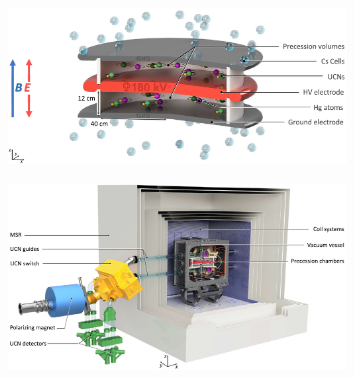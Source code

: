 \begin{refsection}
            \begin{figure}
                \centering
                \includegraphics[width = 0.8\textwidth]{Figures/Introduction/n2EDM.png}
                \caption{}
                \label{fig:n2EDM}
            \end{figure}
            \begin{figure}
                \centering
                \includegraphics[width = 0.8\textwidth]{Figures/Introduction/n2EDM_whole.png}
                \caption{}
                \label{fig:n2EDM_whole}
            \end{figure}        
            

\end{refsection}

